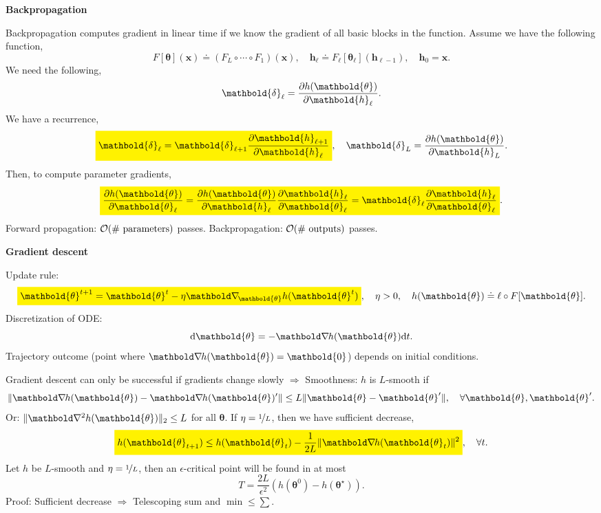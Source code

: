 \documentclass[10pt]{article}
\newenvironment{topic}[1]
{\textbf{\sffamily \footnotesize \colorbox{black}{\rlap{\textbf{\textcolor{white}{#1}}}\hspace{\linewidth}\hspace{-2\fboxsep}}}}
{}
\newenvironment{subtopic}[1]
{\begin{center}\textbf{\footnotesize \sffamily #1}\end{center}}
{}
\renewcommand{\vec}[1]{\ensuremath{\mathbold{#1}}}
\begin{document}
\begin{multicols*}{3}
\begin{topic}{Feedforward networks}
    \end{topic}

    \begin{topic}{Gradient-based learning}

        \begin{subtopic}{Backpropagation}
            Backpropagation computes gradient in linear time if we know the gradient of all basic
            blocks in the function. Assume we have the following function, \[
                F[\vec{\theta}](\vec{x}) \doteq (F_L \circ \cdots \circ F_1)(\vec{x}), \quad \vec{h}_{\ell} \doteq F_{\ell}[\vec{\theta}_{\ell}](\vec{h}_{\ell-1}), \quad \vec{h}_0 = \vec{x}.
            \]
            We need the following, \[
                \vec{\delta}_{\ell} = \pdv{h(\vec{\theta})}{\vec{h}_{\ell}}.
            \]
            We have a recurrence, \[
                \colorbox{yellow}{$\displaystyle \vec{\delta}_{\ell} = \vec{\delta}_{\ell+1} \pdv{\vec{h}_{\ell+1}}{\vec{h}_{\ell}}$}, \quad \vec{\delta}_L = \pdv{h(\vec{\theta})}{\vec{h}_L}.
            \]
            Then, to compute parameter gradients, \[
                \colorbox{yellow}{$\displaystyle \pdv{h(\vec{\theta})}{\vec{\theta}_{\ell}} = \pdv{h(\vec{\theta})}{\vec{h}_{\ell}} \pdv{\vec{h}_{\ell}}{\vec{\theta}_{\ell}} = \vec{\delta}_{\ell} \pdv{\vec{h}_{\ell}}{\vec{\theta}_{\ell}}$}.
            \]
            Forward propagation: $\bigo{\text{\# parameters}}$ passes. Backpropagation: $\bigo{\text{\# outputs}}$ passes.
        \end{subtopic}

        \begin{subtopic}{Gradient descent}
            Update rule: \[
                \colorbox{yellow}{$\displaystyle \vec{\theta}^{t+1} = \vec{\theta}^t - \eta \grad{h(\vec{\theta}^t)}{\vec{\theta}}$}, \quad \eta > 0, \quad h(\vec{\theta}) \doteq \ell \circ F[\vec{\theta}].
            \]
            Discretization of ODE: \[
                \mathrm{d}\vec{\theta} = -\grad{h(\vec{\theta})}{} \mathrm{d}t.
            \]
            Trajectory outcome (point where $\grad{h(\vec{\theta})}{} = \vec{0}$) depends on initial
            conditions.

            Gradient descent can only be successful if gradients change slowly $\Rightarrow$ Smoothness: $h$ is
            $L$-smooth if \[
                \| \grad{h(\vec{\theta})}{} - \grad{h(\vec{\theta})'}{} \| \leq L \| \vec{\theta} - \vec{\theta}' \|, \quad \forall \vec{\theta},\vec{\theta}'.
            \]
            Or: $\| \hess{h(\vec{\theta})}{} \|_2 \leq L$ for all $\vec{\theta}$. If $\eta = \nicefrac{1}{L}$,
            then we have sufficient decrease, \[
                \colorbox{yellow}{$\displaystyle h(\vec{\theta}_{t+1}) \leq h(\vec{\theta}_t) - \frac{1}{2L} \| \grad{h(\vec{\theta}_t)}{} \|^2$}, \quad \forall t.
            \]
            Let $h$ be $L$-smooth and $\eta=\nicefrac{1}{L}$, then an $\epsilon$-critical point will be found
            in at most \[
                T = \frac{2L}{\epsilon^2} (h(\vec{\theta}^0) - h(\vec{\theta}^\star)).
            \]
            Proof: Sufficient decrease $\Rightarrow$ Telescoping sum and $\min \leq \sum$.


\end{subtopic}
\end{topic}
\end{multicols*}
\end{document}
